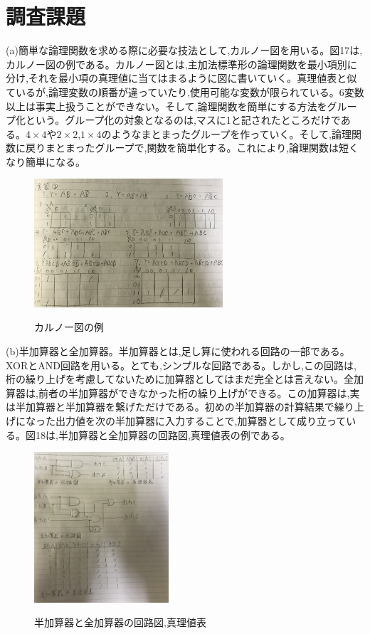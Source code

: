 \documentclass[a4paper,11pt,titlepage]{jarticle}
\begin{document}
\section{調査課題}
(a)簡単な論理関数を求める際に必要な技法として,カルノー図を用いる。図17は,カルノー図の例である。カルノー図とは,主加法標準形の論理関数を最小項別に分け,それを最小項の真理値に当てはまるように図に書いていく。真理値表と似ているが,論理変数の順番が違っていたり,使用可能な変数が限られている。6変数以上は事実上扱うことができない。そして,論理関数を簡単にする方法をグループ化という。グループ化の対象となるのは,マスに1と記されたところだけである。$4\times4$や$2\times2$,$1\times4$のようなまとまったグループを作っていく。そして,論理関数に戻りまとまったグループで,関数を簡単化する。これにより,論理関数は短くなり簡単になる。\par
\begin{figure}[htbp]
  \centering
  \includegraphics[width=70mm]{sample20.png}
  \label{sample16}\\
  \caption{カルノー図の例}
\end{figure}
\par
(b)半加算器と全加算器。半加算器とは,足し算に使われる回路の一部である。XORとAND回路を用いる。とても,シンプルな回路である。しかし,この回路は,桁の繰り上げを考慮してないために加算器としてはまだ完全とは言えない。全加算器は,前者の半加算器ができなかった桁の繰り上げができる。この加算器は,実は半加算器と半加算器を繋げただけである。初めの半加算器の計算結果で繰り上げになった出力値を次の半加算器に入力することで,加算器として成り立っている。図18は,半加算器と全加算器の回路図,真理値表の例である。\par
\begin{figure}[htbp]
  \centering
  \includegraphics[width=50mm]{sample21.png}
  \label{sample17}\\
  \caption{半加算器と全加算器の回路図,真理値表}
\end{figure}
\par
\end{document}
